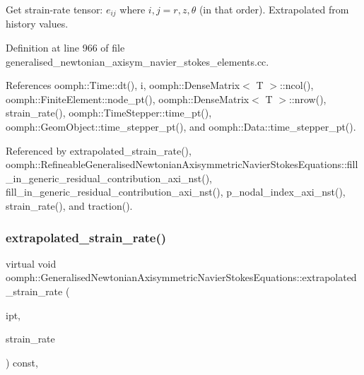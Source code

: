Get strain-\/rate tensor\+: $ e_{ij} $ where $ i,j = r,z,\theta $ (in that order). Extrapolated from history values. 

Definition at line 966 of file generalised\+\_\+newtonian\+\_\+axisym\+\_\+navier\+\_\+stokes\+\_\+elements.\+cc.



References oomph\+::\+Time\+::dt(), i, oomph\+::\+Dense\+Matrix$<$ T $>$\+::ncol(), oomph\+::\+Finite\+Element\+::node\+\_\+pt(), oomph\+::\+Dense\+Matrix$<$ T $>$\+::nrow(), strain\+\_\+rate(), oomph\+::\+Time\+Stepper\+::time\+\_\+pt(), oomph\+::\+Geom\+Object\+::time\+\_\+stepper\+\_\+pt(), and oomph\+::\+Data\+::time\+\_\+stepper\+\_\+pt().



Referenced by extrapolated\+\_\+strain\+\_\+rate(), oomph\+::\+Refineable\+Generalised\+Newtonian\+Axisymmetric\+Navier\+Stokes\+Equations\+::fill\+\_\+in\+\_\+generic\+\_\+residual\+\_\+contribution\+\_\+axi\+\_\+nst(), fill\+\_\+in\+\_\+generic\+\_\+residual\+\_\+contribution\+\_\+axi\+\_\+nst(), p\+\_\+nodal\+\_\+index\+\_\+axi\+\_\+nst(), strain\+\_\+rate(), and traction().

\mbox{\label{classoomph_1_1GeneralisedNewtonianAxisymmetricNavierStokesEquations_a0d6a8776917c3110cf9159bcc126d579}} 
\subsubsection{\texorpdfstring{extrapolated\+\_\+strain\+\_\+rate()}{extrapolated\_strain\_rate()}\hspace{0.1cm}{\footnotesize\ttfamily [2/2]}}
{\footnotesize\ttfamily virtual void oomph\+::\+Generalised\+Newtonian\+Axisymmetric\+Navier\+Stokes\+Equations\+::extrapolated\+\_\+strain\+\_\+rate (\begin{DoxyParamCaption}\item[{const unsigned \&}]{ipt,  }\item[{\hyperlink{classoomph_1_1DenseMatrix}{Dense\+Matrix}$<$ double $>$ \&}]{strain\+\_\+rate }\end{DoxyParamCaption}) const\hspace{0.3cm}{\ttfamily [inline]}, {\ttfamily [virtual]}}



